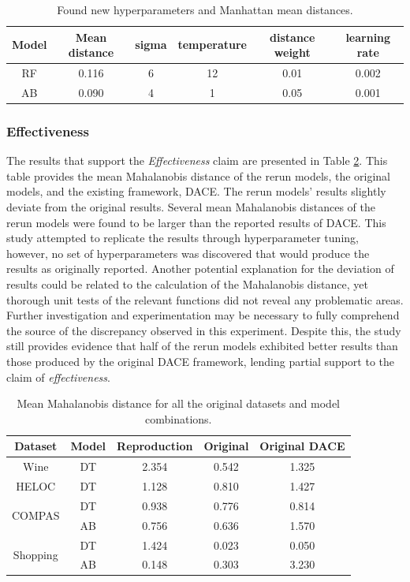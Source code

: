 \begin{table}[h!]
\centering
\begin{tabular}{cccccc}
Model & Mean distance & sigma & temperature & distance weight & learning rate \\ \hline
RF    & 0.116         & 6     & 12          & 0.01            & 0.002         \\
AB    & 0.090         & 4     & 1           & 0.05            & 0.001         \\ \hline
\end{tabular}
\caption{Found new hyperparameters and Manhattan mean distances.}
\label{table:found hparams}
\end{table}

\subsubsection{Effectiveness}
The results that support the \textit{Effectiveness} claim are presented in Table \ref{table:result2}. This table provides the mean Mahalanobis distance of the rerun models, the original models, and the existing framework, DACE. The rerun models' results slightly deviate from the original results. Several mean Mahalanobis distances of the rerun models were found to be larger than the reported results of DACE.
This study attempted to replicate the results through hyperparameter tuning, however, no set of hyperparameters was discovered that would produce the results as originally reported. Another potential explanation for the deviation of results could be related to the calculation of the Mahalanobis distance, yet thorough unit tests of the relevant functions did not reveal any problematic areas.
Further investigation and experimentation may be necessary to fully comprehend the source of the discrepancy observed in this experiment.
Despite this, the study still provides evidence that half of the rerun models exhibited better results than those produced by the original DACE framework, lending partial support to the claim of \textit{effectiveness}.

\begin{table}[]
\centering
\begin{tabular}{ccccc}
Dataset                   & Model & Reproduction & Original & Original DACE \\ \hline
Wine                      & DT    & 2.354  & 0.542    & 1.325         \\
HELOC                     & DT    & 1.128  & 0.810    & 1.427         \\
\multirow{2}{*}{COMPAS}   & DT    & 0.938  & 0.776    & 0.814         \\
                          & AB    & 0.756  & 0.636    & 1.570         \\
\multirow{2}{*}{Shopping} & DT    & 1.424  & 0.023    & 0.050         \\
                          & AB    & 0.148  & 0.303    & 3.230         \\ \hline
\end{tabular}
\caption{Mean Mahalanobis distance for all the original datasets and model combinations.}
\label{table:result2}
\end{table}

